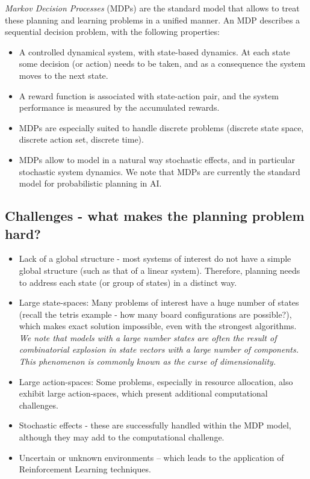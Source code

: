 \emph{Markov Decision Processes} (MDPs) are the standard model that allows to treat these planning and learning problems in a unified manner. An MDP describes a sequential decision problem, with the following properties:
\begin{itemize}
  \item A controlled dynamical system, with state-based dynamics. At each state some decision (or action) needs to be taken, and as a consequence the system moves to the next state.
  \item A reward function is associated with state-action pair, and the system performance is measured by the accumulated rewards.
  \item MDPs are especially suited to handle discrete problems (discrete state space, discrete action set, discrete time).
  \item MDPs allow to model in a natural way stochastic effects, and in particular stochastic system dynamics. We note that MDPs are currently the standard model for probabilistic planning in AI.
\end{itemize}

\subsection*{Challenges - what makes the planning problem hard?}
\begin{itemize}
  \item Lack of a global structure - most systems of interest do not have a simple global structure (such as that of a linear system). Therefore, planning needs to address each state (or group of states) in a distinct way.
  \item Large state-spaces: Many problems of interest have a huge number of states (recall the tetris example - how many board configurations are possible?), which makes exact solution impossible, even with the strongest algorithms.
        \emph{We note that models with a large number states are often the result of  combinatorial explosion in state vectors with a large number of components. This phenomenon is commonly known as the curse of dimensionality.}
  \item Large action-spaces: Some problems, especially in resource allocation, also exhibit large action-spaces, which present additional computational challenges.
  \item Stochastic effects - these are successfully handled within the MDP model, although they may add to the computational challenge.
  \item Uncertain or unknown environments -- which leads to the application of Reinforcement Learning techniques.
\end{itemize}

